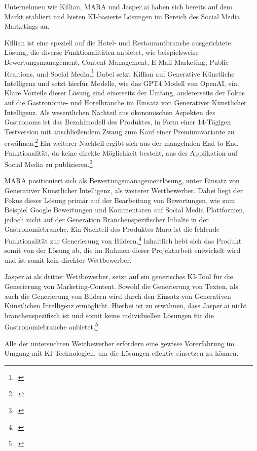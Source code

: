 Unternehmen wie Killian, MARA und Jasper.ai haben sich bereits auf dem Markt etabliert und bieten KI-basierte Lösungen im Bereich des Social Media Marketings an.

Killian ist eine speziell auf die Hotel- und Restaurantbranche ausgerichtete Lösung, die diverse Funktionalitäten anbietet, wie beispielsweise Bewertungsmanagement, Content Management, E-Mail-Marketing, Public Realtions, und Social Media.\footcite{kilian_ai_produkt}
Dabei setzt Killian auf Generative Künstliche Intelligenz und setzt hierfür Modelle, wie das GPT4 Modell von OpenAI, ein.
Klare Vorteile dieser Lösung sind einerseits der Umfang, andererseits der Fokus auf die Gastronomie- und Hotelbranche im Einsatz von Generativer Künstlicher Intelligenz.
Als wesentlichen Nachteil aus ökonomischen Aspekten des Gastronoms ist das Bezahlmodell des Produktes, in Form einer 14-Tägigen Testversion mit anschließendem Zwang zum Kauf einer Premiumvariante zu erwähnen.\footcite{kilian_ai_preise}
Ein weiterer Nachteil ergibt sich aus der mangelnden End-to-End-Funktionalität, da keine direkte Möglichkeit besteht, aus der Applikation auf Social Media zu publizieren.\footcite{kilian_ai_funktionen}

MARA positioniert sich als Bewertungsmanagementlösung, unter Einsatz von Generativer Künstlicher Intelligenz, als weiterer Wettbewerber.
Dabei liegt der Fokus dieser Lösung primär auf der Bearbeitung von Bewertungen, wie zum Beispiel Google Bewertungen und Kommentaren auf Social Media Plattformen, jedoch nicht auf der Generation Branchenspezifischer Inhalte in der Gastronomiebranche.
Ein Nachteil des Produktes Mara ist die fehlende Funktionalität zur Generierung von Bildern.\footcite{mara_solutions_features}
Inhaltlich hebt sich das Produkt somit von der Lösung ab, die im Rahmen dieser Projektarbeit entwickelt wird und ist somit kein direkter Wettbewerber.

Jasper.ai als dritter Wettbewerber, setzt auf ein generisches KI-Tool für die Generierung von Marketing-Content.
Sowohl die Generierung von Texten, als auch die Generierung von Bildern wird durch den Einsatz von Generativen Künstlichen Intelligenz ermöglicht.
Hierbei ist zu erwähnen, dass Jasper.ai nicht branchenspezifisch ist und somit keine individuellen Lösungen für die Gastronomiebranche anbietet.\footcite{jasper_ai_product_marketers}

Alle der untersuchten Wettbewerber erfordern eine gewisse Vorerfahrung im Umgang mit KI-Technologien, um die Lösungen effektiv einsetzen zu können.

